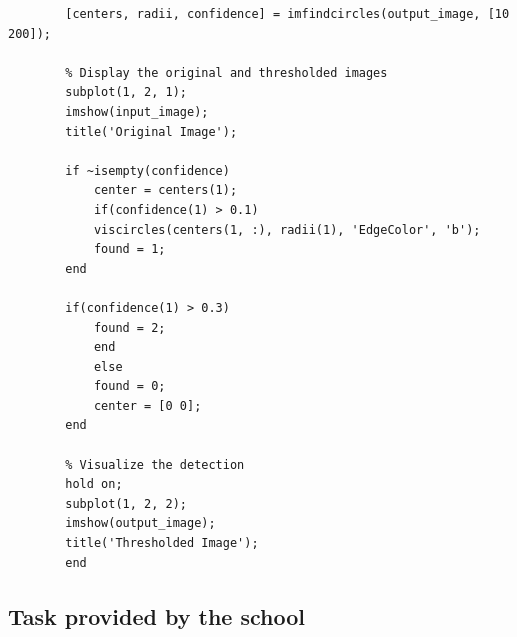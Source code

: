 \documentclass{article}
\begin{document}
\begin{verbatim}
		[centers, radii, confidence] = imfindcircles(output_image, [10 200]);
		
		% Display the original and thresholded images
		subplot(1, 2, 1);
		imshow(input_image);
		title('Original Image');
		
		if ~isempty(confidence)
			center = centers(1);
			if(confidence(1) > 0.1)
			viscircles(centers(1, :), radii(1), 'EdgeColor', 'b'); 
			found = 1;
		end
		
		if(confidence(1) > 0.3)
			found = 2;
			end
			else
			found = 0;
			center = [0 0];
		end
		
		% Visualize the detection
		hold on;
		subplot(1, 2, 2);
		imshow(output_image);
		title('Thresholded Image');
		end
	\end{verbatim}
	\subsection{Task provided by the school}
	\label{appendix:task}
	
\end{document}
